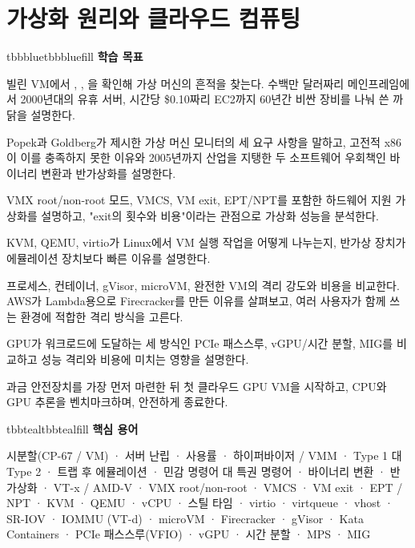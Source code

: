 \setcounter{chapter}{1}
\chapter{가상화 원리와 클라우드 컴퓨팅}

\begin{calloutbox}{tbbblue}{tbbbluefill}
{\normalsize\bfseries\color{tbbblue}학습 목표}\par\vspace{3pt}
\begin{tbbitemize}
  \item 빌린 VM에서 , , 을 확인해 가상 머신의 흔적을 찾는다. 수백만 달러짜리 메인프레임에서 2000년대의 유휴 서버, 시간당 \$0.10짜리 EC2까지 60년간 비싼 장비를 나눠 쓴 까닭을 설명한다.
  \item Popek과 Goldberg가 제시한 가상 머신 모니터의 세 요구 사항을 말하고, 고전적 x86이 이를 충족하지 못한 이유와 2005년까지 산업을 지탱한 두 소프트웨어 우회책인 바이너리 변환과 반가상화를 설명한다.
  \item VMX root/non-root 모드, VMCS, VM exit, EPT/NPT를 포함한 하드웨어 지원 가상화를 설명하고, "exit의 횟수와 비용"이라는 관점으로 가상화 성능을 분석한다.
  \item KVM, QEMU, virtio가 Linux에서 VM 실행 작업을 어떻게 나누는지, 반가상 장치가 에뮬레이션 장치보다 빠른 이유를 설명한다.
  \item 프로세스, 컨테이너, gVisor, microVM, 완전한 VM의 격리 강도와 비용을 비교한다. AWS가 Lambda용으로 Firecracker를 만든 이유를 살펴보고, 여러 사용자가 함께 쓰는 환경에 적합한 격리 방식을 고른다.
  \item GPU가 워크로드에 도달하는 세 방식인 PCIe 패스스루, vGPU/시간 분할, MIG를 비교하고 성능 격리와 비용에 미치는 영향을 설명한다.
  \item 과금 안전장치를 가장 먼저 마련한 뒤 첫 클라우드 GPU VM을 시작하고, CPU와 GPU 추론을 벤치마크하며, 안전하게 종료한다.
\end{tbbitemize}
\end{calloutbox}

\vspace{5.0pt}

\begin{calloutbox}{tbbteal}{tbbtealfill}
{\normalsize\bfseries\color{tbbteal}핵심 용어}\par\vspace{3pt}
시분할(CP-67 / VM) · 서버 난립 · 사용률 · 하이퍼바이저 / VMM · Type 1 대 Type 2 · 트랩 후 에뮬레이션 · 민감 명령어 대 특권 명령어 · 바이너리 변환 · 반가상화 · VT-x / AMD-V · VMX root/non-root · VMCS · VM exit · EPT / NPT · KVM · QEMU · vCPU · 스틸 타임 · virtio · virtqueue · vhost · SR-IOV · IOMMU (VT-d) · microVM · Firecracker · gVisor · Kata Containers · PCIe 패스스루(VFIO) · vGPU · 시간 분할 · MPS · MIG
\end{calloutbox}

